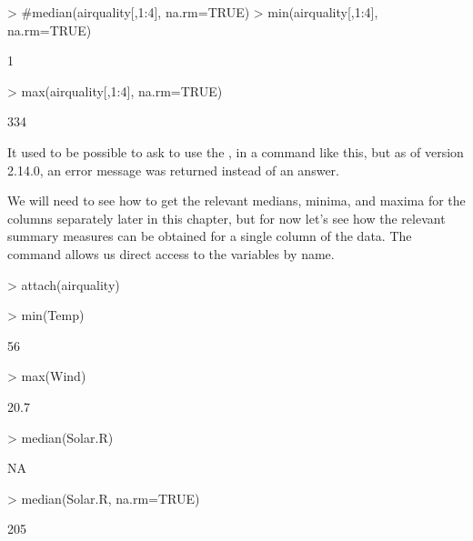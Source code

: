 \begin{Schunk}
\begin{Sinput}
> #median(airquality[,1:4], na.rm=TRUE) 
> min(airquality[,1:4], na.rm=TRUE) 
\end{Sinput}
\begin{Soutput}
[1] 1
\end{Soutput}
\begin{Sinput}
> max(airquality[,1:4], na.rm=TRUE) 
\end{Sinput}
\begin{Soutput}
[1] 334
\end{Soutput}
\end{Schunk}

 
It used to be possible to ask \R{} to use the , in a command like this, but as of version 2.14.0, an error message was returned instead of an answer. 
 
We will need to see how to get the relevant medians, minima, and maxima for the columns separately later in this chapter, but for now let's see how the relevant summary measures can be obtained for a single column of the  data. The  command allows us direct access to the variables by name. 
\begin{Schunk}
\begin{Sinput}
> attach(airquality) 
\end{Sinput}
\end{Schunk}

\begin{Schunk}
\begin{Sinput}
> min(Temp) 
\end{Sinput}
\begin{Soutput}
[1] 56
\end{Soutput}
\begin{Sinput}
> max(Wind) 
\end{Sinput}
\begin{Soutput}
[1] 20.7
\end{Soutput}
\begin{Sinput}
> median(Solar.R) 
\end{Sinput}
\begin{Soutput}
[1] NA
\end{Soutput}
\begin{Sinput}
> median(Solar.R, na.rm=TRUE) 
\end{Sinput}
\begin{Soutput}
[1] 205
\end{Soutput}
\end{Schunk}

